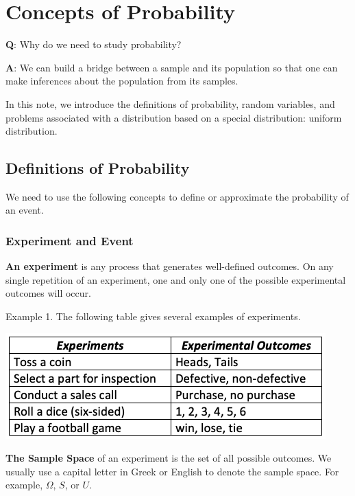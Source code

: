 \documentclass[
]{book}
\begin{document}
\hypertarget{concepts-of-probability}{%
\chapter{Concepts of Probability}\label{concepts-of-probability}}

\hfill\break

\textbf{Q}: Why do we need to study probability?

\textbf{A}: We can build a bridge between a sample and its population so that one can make inferences about the population from its samples.

In this note, we introduce the definitions of probability, random variables, and problems associated with a distribution based on a special distribution: uniform distribution.

\hypertarget{definitions-of-probability}{%
\section{Definitions of Probability}\label{definitions-of-probability}}

We need to use the following concepts to define or approximate the probability of an event.

\hypertarget{experiment-and-event}{%
\subsection{Experiment and Event}\label{experiment-and-event}}

\textbf{An experiment} is any process that generates well-defined outcomes. On any single repetition of an experiment, one and only one of the possible experimental outcomes will occur.

Example 1. The following table gives several examples of experiments.

\begin{center}\includegraphics[width=0.55\linewidth]{week03/experiments} \end{center}

\textbf{The Sample Space} of an experiment is the set of all possible outcomes. We usually use a capital letter in Greek or English to denote the sample space. For example, \(\Omega\), \(S\), or \(U\).
\end{document}
